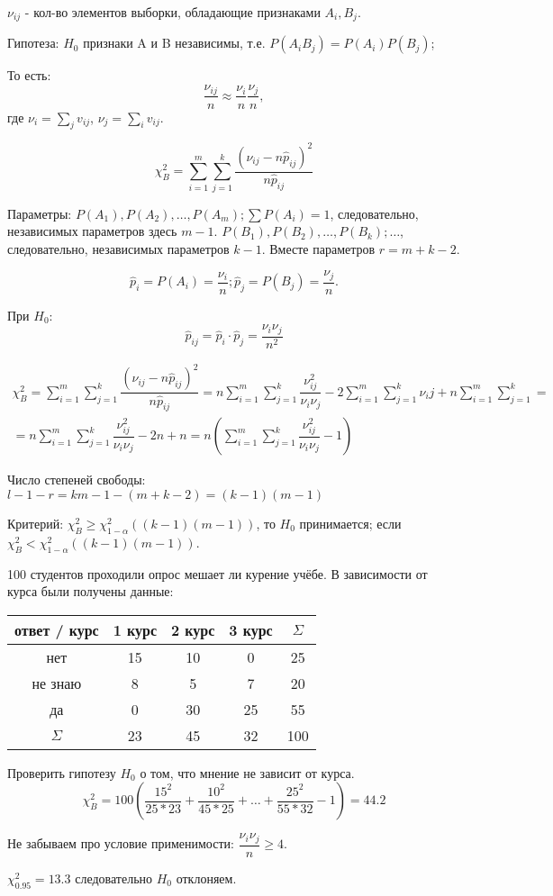 $\nu_{ij}$ - кол-во элементов выборки, обладающие признаками $A_i, B_j$.

Гипотеза: $H_0$ признаки A и B независимы, т.е.
$P(A_i B_j) = P(A_i) P(B_j)$;

То есть:
\[
  \dfrac{\nu_{ij}}{n} \approx \dfrac{\nu_i}{n} \dfrac{\nu_j}{n},
\]
где $\nu_i = \sum_j v_{ij}$, $\nu_j = \sum_i v_{ij}$.

\[
  \chi^2_B = \sum_{i=1}^m \sum_{j=1}^k \dfrac{(\nu_{ij} - n \hat p_{ij})^2}{n \hat p_{ij}}
\]

Параметры: $P(A_1), P(A_2), \dots, P(A_m); \sum P(A_i) = 1$, следовательно, независимых параметров здесь $m-1$. $P(B_1), P(B_2), \dots, P(B_k); \dots$, следовательно, независимых параметров $k-1$. Вместе параметров $r = m+k-2$.

\[
  \hat p_{i} = P(A_i) = \dfrac{\nu_i}{n}; \hat p_j = P(B_j) = \dfrac{\nu_j}{n}.
\]

При $H_0$:
\[
  \hat p_{ij} = \hat p_i \cdot \hat p_j = \dfrac{\nu_i \nu_j}{n^2}
\]

\begin{multline*}
  \chi^2_B
  = \sum_{i=1}^m \sum_{j=1}^k \dfrac{(\nu_{ij} - n \hat p_{ij})^2}{n \hat p_{ij}}
  = n \sum_{i=1}^m \sum_{j=1}^k \dfrac{\nu^2_{ij}}{\nu_i \nu_j} - 2 \sum_{i=1}^m \sum_{j=1}^k \nu_ij + n \sum_{i=1}^m \sum_{j=1}^k = \\
  = n \sum_{i=1}^m \sum_{j=1}^k \dfrac{\nu^2_{ij}}{\nu_i \nu_j} - 2n + n
  = n \left(\sum_{i=1}^m \sum_{j=1}^k \dfrac{\nu^2_{ij}}{\nu_i \nu_j} - 1\right)
\end{multline*}

Число степеней свободы:
$l-1-r = k m - 1 - (m+k-2) = (k-1)(m-1)$

Критерий: $\chi^2_B \geqslant \chi^2_{1-\alpha} ( (k-1)(m-1) )$, то $H_0$ принимается;
если $\chi^2_B < \chi^2_{1-\alpha} ( (k-1)(m-1) )$.

\begin{ex}
  100 студентов проходили опрос мешает ли курение учёбе.
  В зависимости от курса были получены данные:

  \begin{center}
    \begin{tabular}{|c|c|c|c|c|}
      \hline
      ответ / курс & 1 курс & 2 курс & 3 курс & $ \Sigma $ \\
      \hline
      нет & 15 & 10 & 0 & 25\\
      \hline
      не знаю & 8 & 5 & 7 & 20 \\
      \hline
      да & 0 & 30 & 25 & 55 \\
      \hline
      $ \Sigma $  & 23 & 45 & 32 & 100 \\
      \hline
    \end{tabular}
  \end{center}

  Проверить гипотезу $H_0$ о том, что мнение не зависит от курса.
  \[
  \chi^2_B = 100 (\dfrac{15^2}{25*23} + \dfrac{10^2}{45*25} + \dots + \dfrac{25^2}{55*32} - 1) = 44.2
  \]

  Не забываем про условие применимости: $\dfrac{\nu_i \nu_j}{n} \geqslant 4$.

  $\chi^2_{0.95} = 13.3$ следовательно $H_0$ отклоняем.
\end{ex}

